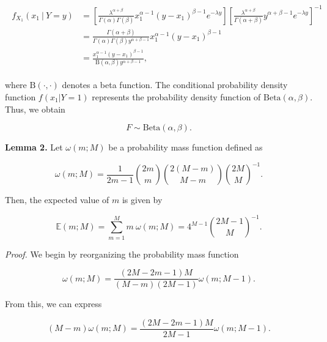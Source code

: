 \documentclass[11pt, class=article, crop=false]{standalone}
\begin{document}
\begin{align}
    \begin{split}
        f_{X_1}(x_1~|~Y = y)
        &= 
        \left[
            \frac{\lambda^{\alpha + \beta}}{\Gamma(\alpha) \Gamma(\beta)}x_1^{\alpha - 1} (y - x_1)^{\beta - 1} e^{-\lambda y}
        \right]
        \left[
            \frac{\lambda^{\alpha + \beta}}{\Gamma(\alpha + \beta)} y^{\alpha + \beta - 1} e^{-\lambda y}
        \right]^{-1}\\
        &= \frac{\Gamma(\alpha + \beta)}{\Gamma(\alpha) \Gamma(\beta) y^{\alpha + \beta - 1}} x_1^{\alpha - 1} (y - x_1)^{\beta - 1}\\
        &= \frac{x_1^{\alpha - 1} (y - x_1)^{\beta - 1}}{\mbox{B}(\alpha, \beta) y^{\alpha + \beta - 1}},
    \end{split}
    \label{eq:dbeta}
\end{align}

where $\mbox{B}(\cdot, \cdot)$ denotes a beta function.
The conditional probability density function $f(x_1 | Y = 1)$ represents the probability density function of $\mbox{Beta}(\alpha, \beta)$.
Thus, we obtain

\begin{equation}
    F \sim \mbox{Beta}(\alpha, \beta).
\end{equation}

\textbf{Lemma 2.}
Let $\omega(m; M)$ be a probability mass function defined as

\begin{equation}
    \omega(m; M) = \frac{1}{2m - 1} \binom{2m}{m} \binom{2(M - m)}{M - m} \binom{2M}{M}^{-1}.
\end{equation}

Then, the expected value of $m$ is given by

\begin{equation}
    \mathbb{E}(m; M) = \sum_{m = 1}^M m~\omega(m; M) = 4^{M-1} \binom{2M-1}{M}^{-1}.
\end{equation}

\textit{Proof.}  
We begin by reorganizing the probability mass function

\begin{equation}
    \omega(m; M) = \frac{(2M - 2m - 1) M}{(M - m)(2M - 1)} \omega(m; M - 1).
\end{equation}

From this, we can express

\begin{equation}
    (M - m) \omega(m; M) = \frac{(2M - 2m - 1) M}{2M - 1} \omega(m; M - 1).
\end{equation}
\end{document}

